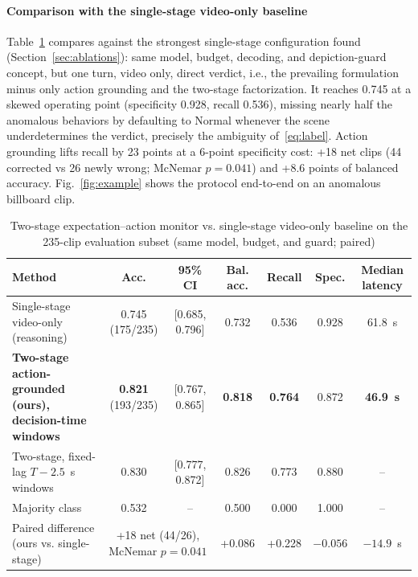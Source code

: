 \documentclass[conference]{IEEEtran}
\begin{document}
\paragraph{Comparison with the single-stage video-only baseline} Table~\ref{tab:monitor} compares against the strongest single-stage configuration found (Section~\ref{sec:ablations}): same model, budget, decoding, and depiction-guard concept, but one turn, video only, direct verdict, i.e., the prevailing formulation minus only action grounding and the two-stage factorization. It reaches 0.745 at a skewed operating point (specificity 0.928, recall 0.536), missing nearly half the anomalous behaviors by defaulting to Normal whenever the scene underdetermines the verdict, precisely the ambiguity of~\eqref{eq:label}. Action grounding lifts recall by 23 points at a 6-point specificity cost: +18 net clips (44 corrected vs 26 newly wrong; McNemar $p = 0.041$) and +8.6 points of balanced accuracy. Fig.~\ref{fig:example} shows the protocol end-to-end on an anomalous billboard clip.

\begin{table}[htbp]
\caption{Two-stage expectation--action monitor vs. single-stage video-only baseline on the 235-clip evaluation subset (same model, budget, and guard; paired)}
\begin{center}
\footnotesize
\begin{tabular}{|l|c|c|c|c|c|c|}
\hline
\textbf{Method} & \textbf{Acc.} & \textbf{95\% CI} & \textbf{Bal. acc.} & \textbf{Recall} & \textbf{Spec.} & \textbf{Median latency} \\
\hline
Single-stage video-only (reasoning) & 0.745 (175/235) & [0.685, 0.796] & 0.732 & 0.536 & 0.928 & 61.8~s \\
\hline
\textbf{Two-stage action-grounded (ours), decision-time windows} & \textbf{0.821} (193/235) & [0.767, 0.865] & \textbf{0.818} & \textbf{0.764} & 0.872 & \textbf{46.9~s} \\
\hline
Two-stage, fixed-lag $T-2.5$~s windows & 0.830 & [0.777, 0.872] & 0.826 & 0.773 & 0.880 & -- \\
\hline
Majority class & 0.532 & -- & 0.500 & 0.000 & 1.000 & -- \\
\hline
Paired difference (ours vs. single-stage) & \multicolumn{2}{c|}{+18 net (44/26), McNemar $p = 0.041$} & +0.086 & +0.228 & $-0.056$ & $-14.9$~s \\
\hline
\end{tabular}
\label{tab:monitor}
\end{center}
\end{table}
\end{document}
